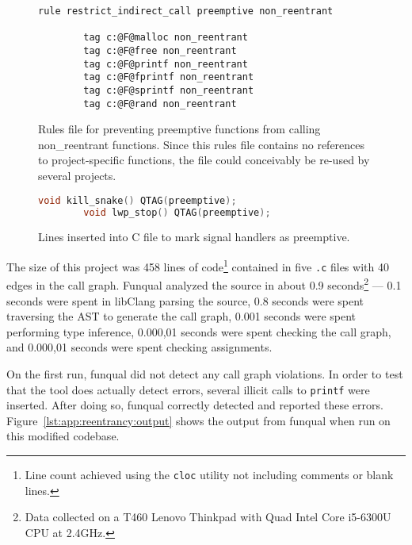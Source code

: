 \begin{figure}
    \begin{lstlisting}[gobble=8]
        rule restrict_indirect_call preemptive non_reentrant

        tag c:@F@malloc non_reentrant
        tag c:@F@free non_reentrant
        tag c:@F@printf non_reentrant
        tag c:@F@fprintf non_reentrant
        tag c:@F@sprintf non_reentrant
        tag c:@F@rand non_reentrant
    \end{lstlisting}
    \caption{Rules file for preventing preemptive functions from calling non\_reentrant functions.  Since this rules file contains no references to project-specific functions, the file could conceivably be re-used by several projects.}
    \label{lst:app:reentrancy:rules}
\end{figure}

\begin{figure}
    \begin{lstlisting}[language=c,gobble=8]
        void kill_snake() QTAG(preemptive);
        void lwp_stop() QTAG(preemptive);
    \end{lstlisting}
    \caption{Lines inserted into C file to mark signal handlers as preemptive.}
    \label{lst:app:reentrancy:handlers}
\end{figure}

The size of this project was 458 lines of code\footnote{Line count achieved using the \lstinline{cloc} utility not including comments or blank lines.} contained in five \lstinline{.c} files with 40 edges in the call graph.  Funqual analyzed the source in about 0.9 seconds\footnote{Data collected on a T460 Lenovo Thinkpad with Quad Intel Core i5-6300U CPU at 2.4GHz.} --- 0.1 seconds were spent in libClang parsing the source, 0.8 seconds were spent traversing the AST to generate the call graph, 0.001 seconds were spent performing type inference, 0.000,01 seconds were spent checking the call graph, and 0.000,01 seconds were spent checking assignments. 

On the first run, funqual did not detect any call graph violations.  In order to test that the tool does actually detect errors, several illicit calls to \lstinline{printf} were inserted.  After doing so, funqual correctly detected and reported these errors.  Figure~\ref{lst:app:reentrancy:output} shows the output from funqual when run on this modified codebase.

